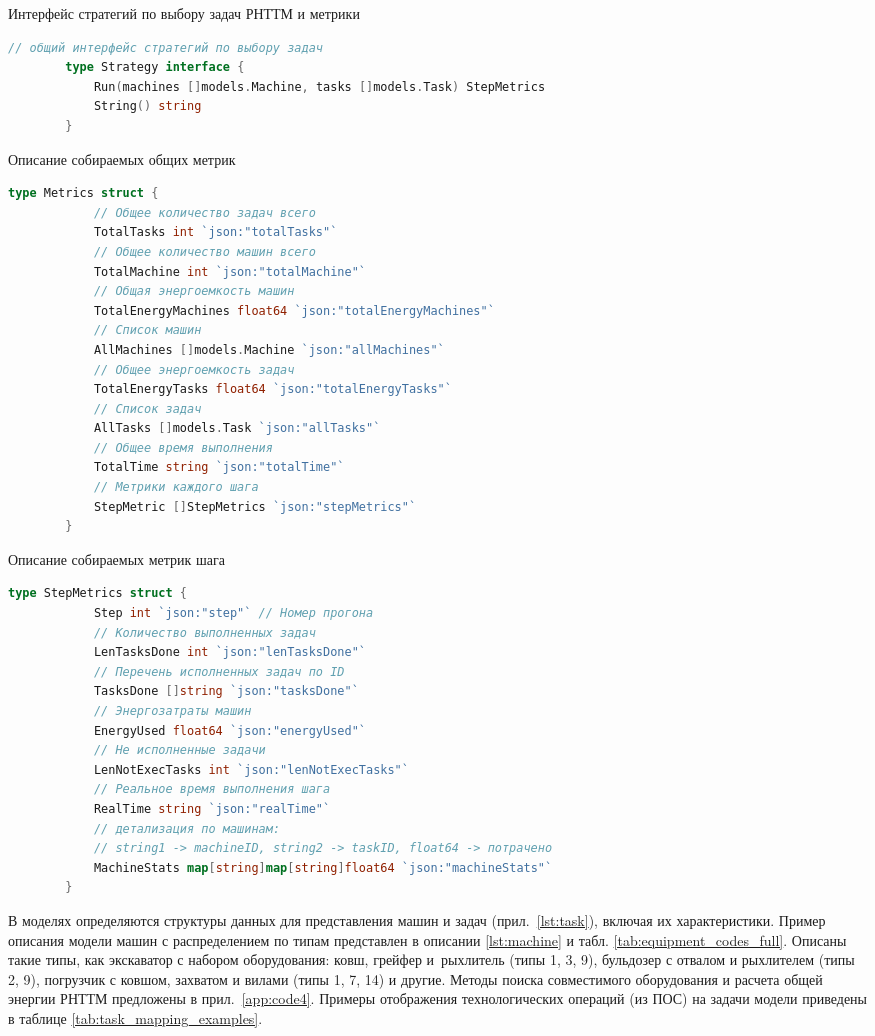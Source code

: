 \begin{ListingEnv}
	\captiondelim{ }
	\caption{Интерфейс стратегий по выбору задач РНТТМ и метрики}\label{lst:strategy}
	\begin{lstlisting}[language=Go]
		// общий интерфейс стратегий по выбору задач
		type Strategy interface {
			Run(machines []models.Machine, tasks []models.Task) StepMetrics
			String() string
		}
	\end{lstlisting}
\end{ListingEnv}

\begin{ListingEnv}
	\captiondelim{ }
	\caption{Описание собираемых общих метрик}\label{lst:metrics}
	\begin{lstlisting}[language=Go]
		type Metrics struct {
			// Общее количество задач всего
			TotalTasks int `json:"totalTasks"`
			// Общее количество машин всего
			TotalMachine int `json:"totalMachine"`
			// Общая энергоемкость машин
			TotalEnergyMachines float64 `json:"totalEnergyMachines"`
			// Список машин
			AllMachines []models.Machine `json:"allMachines"`
			// Общее энергоемкость задач
			TotalEnergyTasks float64 `json:"totalEnergyTasks"`
			// Список задач
			AllTasks []models.Task `json:"allTasks"`
			// Общее время выполнения
			TotalTime string `json:"totalTime"`
			// Метрики каждого шага
			StepMetric []StepMetrics `json:"stepMetrics"`
		}
	\end{lstlisting}
\end{ListingEnv}

\begin{ListingEnv}
	\captiondelim{ }
	\caption{Описание собираемых метрик шага}\label{lst:metrics_step}
	\begin{lstlisting}[language=Go]
		type StepMetrics struct {
			Step int `json:"step"` // Номер прогона
			// Количество выполненных задач
			LenTasksDone int `json:"lenTasksDone"`
			// Перечень исполненных задач по ID
			TasksDone []string `json:"tasksDone"`
			// Энергозатраты машин
			EnergyUsed float64 `json:"energyUsed"`
			// Не исполненные задачи
			LenNotExecTasks int `json:"lenNotExecTasks"`
			// Реальное время выполнения шага
			RealTime string `json:"realTime"`
			// детализация по машинам:
			// string1 -> machineID, string2 -> taskID, float64 -> потрачено
			MachineStats map[string]map[string]float64 `json:"machineStats"`
		}
	\end{lstlisting}
\end{ListingEnv}

В моделях определяются структуры данных для представления машин и задач (прил.\ \ref{lst:task}), включая их характеристики. Пример описания модели машин с распределением по типам представлен в описании \ref{lst:machine} и табл. \ref{tab:equipment_codes_full}. Описаны такие типы, как экскаватор с набором оборудования: ковш, грейфер и~рыхлитель (типы 1, 3, 9), бульдозер с отвалом и рыхлителем (типы 2, 9), погрузчик с ковшом, захватом и вилами (типы 1, 7, 14) и другие. Методы поиска совместимого оборудования и расчета общей энергии РНТТМ предложены в прил.~\ref{app:code4}. Примеры отображения технологических операций (из ПОС) на задачи модели приведены в таблице \ref{tab:task_mapping_examples}.

